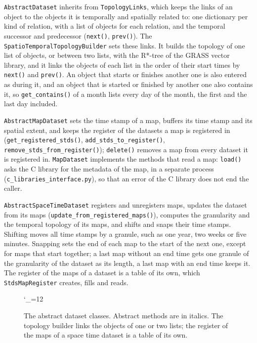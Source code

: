 \documentclass[10pt,a4paper]{article}
\newcommand{\umlfigure}[1]{%
  \begingroup\catcode`\_=12 \ttfamily\endgroup}
\newcommand{\code}[1]{\texttt{#1}}
\begin{document}
\code{AbstractDataset} inherits from \code{TopologyLinks}, which keeps the
links of an object to the objects it is temporally and spatially related to:
one dictionary per kind of relation, with a list of objects for each relation,
and the temporal successor and predecessor (\code{next()}, \code{prev()}).
The \code{SpatioTemporalTopologyBuilder} sets these links. It builds the
topology of one list of objects, or between two lists, with the R*-tree of the
GRASS vector library, and it links the objects of each list in the order of
their start times by \code{next()} and \code{prev()}. An object that starts or finishes another
one is also entered as during it, and an object that is started or finished by
another one also contains it, so \code{get\_contains()} of a month lists every
day of the month, the first and the last day included.

\code{AbstractMapDataset} sets the time stamp of a map, buffers its time stamp
and its spatial extent, and keeps the register of the datasets a map is
registered in (\code{get\_registered\_stds()}, \code{add\_stds\_to\_register()},
\code{remove\_stds\_from\_register()}); \code{delete()} removes a map from every
dataset it is registered in. \code{MapDataset} implements the methods that
read a map: \code{load()} asks the C library for the metadata of the map, in a
separate process (\code{c\_libraries\_interface.py}), so that an error of the C
library does not end the caller.

\code{AbstractSpaceTimeDataset} registers and unregisters maps,
updates the dataset from its maps (\code{update\_from\_registered\_maps()}),
computes the granularity and the temporal topology of its maps, and shifts and
snaps their time stamps. Shifting moves all time stamps by a granule, such as
one year, two weeks or five minutes. Snapping sets the end of each map to the
start of the next one, except for maps that start together; a last map without
an end time gets one granule of the granularity of the dataset as its length,
a last map with an end time keeps it. The
register of the maps of a dataset is a table of its own, which
\code{StdsMapRegister} creates, fills and reads.

\begin{figure}[p]
\centering
\umlfigure{datasets}
\caption{The abstract dataset classes. Abstract methods are in italics. The
topology builder links the objects of one or two lists; the register of the
maps of a space time dataset is a table of its own.}
\label{fig:datasets}
\end{figure}
\end{document}
